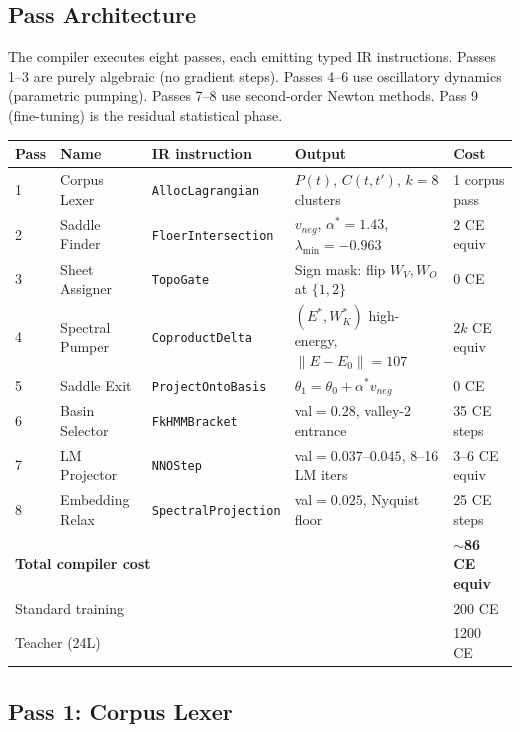 \documentclass[11pt]{amsart}
\begin{document}
\subsection{Pass Architecture}

The compiler executes eight passes, each emitting typed IR instructions.
Passes 1--3 are purely algebraic (no gradient steps).
Passes 4--6 use oscillatory dynamics (parametric pumping).
Passes 7--8 use second-order Newton methods.
Pass 9 (fine-tuning) is the residual statistical phase.

\begin{center}
\small
\begin{tabular}{p{1.5cm}p{3.5cm}p{3.0cm}p{2.5cm}p{2.0cm}}
\toprule
\textbf{Pass} & \textbf{Name} & \textbf{IR instruction} & \textbf{Output} & \textbf{Cost} \\
\midrule
1 & Corpus Lexer & \texttt{AllocLagrangian} & $P(t)$, $C(t,t')$, $k=8$ clusters & 1 corpus pass \\
2 & Saddle Finder & \texttt{FloerIntersection} & $v_{neg}$, $\alpha^*=1.43$, $\lambda_{\min}=-0.963$ & 2 CE equiv \\
3 & Sheet Assigner & \texttt{TopoGate} & Sign mask: flip $W_V, W_O$ at $\{1,2\}$ & 0 CE \\
4 & Spectral Pumper & \texttt{CoproductDelta} & $(E^*, W_K^*)$ high-energy, $\|E-E_0\|=107$ & $2k$ CE equiv \\
5 & Saddle Exit & \texttt{ProjectOntoBasis} & $\theta_1 = \theta_0 + \alpha^* v_{neg}$ & 0 CE \\
6 & Basin Selector & \texttt{FkHMMBracket} & val${=}0.28$, valley-2 entrance & 35 CE steps \\
7 & LM Projector & \texttt{NNOStep} & val${=}0.037$--$0.045$, 8--16 LM iters & 3--6 CE equiv \\
8 & Embedding Relax & \texttt{SpectralProjection} & val${=}0.025$, Nyquist floor & 25 CE steps \\
\midrule
\multicolumn{4}{l}{\textbf{Total compiler cost}} & \textbf{$\sim$86 CE equiv} \\
\multicolumn{4}{l}{Standard training} & 200 CE \\
\multicolumn{4}{l}{Teacher (24L)} & 1200 CE \\
\bottomrule
\end{tabular}
\end{center}

\subsection{Pass 1: Corpus Lexer}
\end{document}
